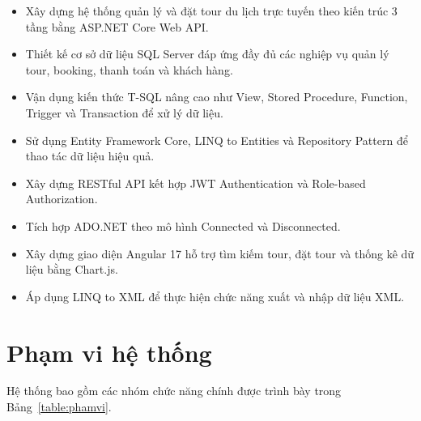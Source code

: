 \begin{itemize}

\item Xây dựng hệ thống quản lý và đặt tour du lịch trực tuyến theo kiến trúc
3 tầng bằng ASP.NET Core Web API.

\item Thiết kế cơ sở dữ liệu SQL Server đáp ứng đầy đủ các nghiệp vụ quản lý
tour, booking, thanh toán và khách hàng.

\item Vận dụng kiến thức T-SQL nâng cao như View, Stored Procedure,
Function, Trigger và Transaction để xử lý dữ liệu.

\item Sử dụng Entity Framework Core, LINQ to Entities và Repository Pattern
để thao tác dữ liệu hiệu quả.

\item Xây dựng RESTful API kết hợp JWT Authentication và
Role-based Authorization.

\item Tích hợp ADO.NET theo mô hình Connected và Disconnected.

\item Xây dựng giao diện Angular 17 hỗ trợ tìm kiếm tour, đặt tour
và thống kê dữ liệu bằng Chart.js.

\item Áp dụng LINQ to XML để thực hiện chức năng xuất và nhập dữ liệu XML.

\end{itemize}

\section{Phạm vi hệ thống}

Hệ thống bao gồm các nhóm chức năng chính được trình bày trong
Bảng~\ref{table:phamvi}.

